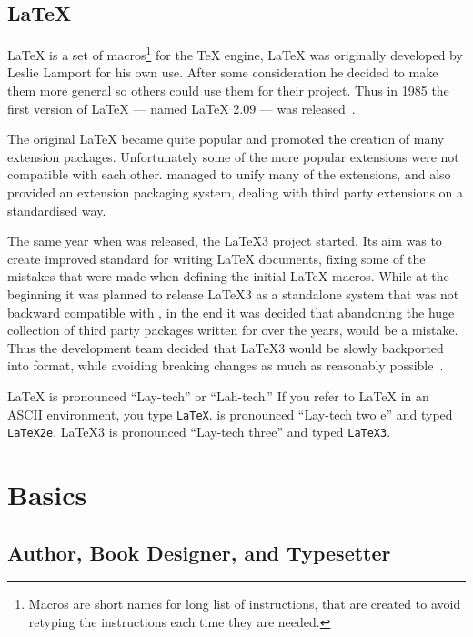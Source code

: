 \subsection{\LaTeX{}}

\LaTeX{} is a set of macros\footnote{Macros are short names for long list of
  instructions, that are created to avoid retyping the instructions each time
  they are needed.} for the \TeX{} engine, \LaTeX{} was originally developed by
Leslie Lamport for his own use. After some
consideration he decided to make them more general so others could use them
for their project. Thus in 1985 the first version of \LaTeX{} --- named
\LaTeX{} 2.09 --- was released~\cite{manual}.

The original \LaTeX{} became quite popular and promoted the creation of many
extension packages. Unfortunately some of the more popular extensions were not
compatible with each other. \LaTeXe{} managed to unify many of the extensions,
and also provided an extension packaging system, dealing with third party
extensions on a standardised way.

The same year when \LaTeXe{} was released, the \LaTeX3 project started. Its aim
was to create improved standard for writing \LaTeX{} documents, fixing some of
the mistakes that were made when defining the initial \LaTeX{} macros. While at
the beginning it was planned to release \LaTeX3 as a standalone system that was
not backward compatible with \LaTeXe{}, in the end it was decided that
abandoning the huge collection of third party packages written for \LaTeXe{}
over the years, would be a mistake. Thus the development team decided that
\LaTeX3 would be slowly backported into \LaTeXe{} format, while avoiding
breaking changes as much as reasonably possible~\cite{quovadis}.

\LaTeX{} is pronounced \enquote{Lay-tech} or \enquote{Lah-tech.} If you refer
to \LaTeX{} in an ASCII environment, you type \texttt{LaTeX}. \LaTeXe{} is
pronounced \enquote{Lay-tech two e} and typed \texttt{LaTeX2e}. \LaTeX3 is
pronounced \enquote{Lay-tech three} and typed \texttt{LaTeX3}.

\section{Basics}

\subsection{Author, Book Designer, and Typesetter}

